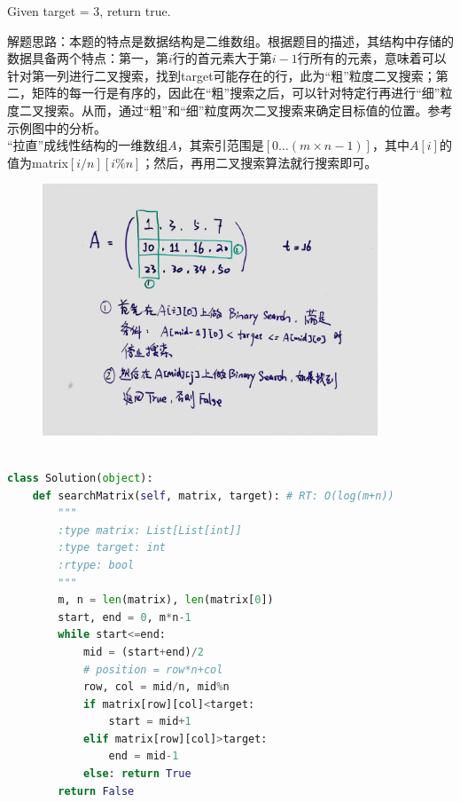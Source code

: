 \documentclass[a4paper,10pt]{article}
\begin{document}
\noindent Given target = 3, return true. \\

\begin{CJK*}{UTF8}{gbsn}
\noindent 解题思路：本题的特点是数据结构是二维数组。根据题目的描述，其结构中存储的数据具备两个特点：第一，第$i$行的首元素大于第$i-1$行所有的元素，意味着可以针对第一列进行二叉搜索，找到target可能存在的行，此为“粗”粒度二叉搜索；第二，矩阵的每一行是有序的，因此在“粗”搜索之后，可以针对特定行再进行“细”粒度二叉搜索。从而，通过“粗”和“细”粒度两次二叉搜索来确定目标值的位置。参考示例图中的分析。\\
“拉直”成线性结构的一维数组$A$，其索引范围是$[0 \dots (m\times n-1)]$，其中$A[i]$的值为matrix$[i/n][i\%n]$；然后，再用二叉搜索算法就行搜索即可。
\end{CJK*}

\begin{figure}[h]
    \includegraphics[width=10cm]{leetcode74.jpg}
    \centering\\
\end{figure}

\begin{lstlisting}[language=Python, caption=Problem74. Search a 2D Matrix]

class Solution(object):
    def searchMatrix(self, matrix, target): # RT: O(log(m+n))
        """
        :type matrix: List[List[int]]
        :type target: int
        :rtype: bool
        """
        m, n = len(matrix), len(matrix[0])
        start, end = 0, m*n-1
        while start<=end:
            mid = (start+end)/2
            # position = row*n+col
            row, col = mid/n, mid%n
            if matrix[row][col]<target:
                start = mid+1
            elif matrix[row][col]>target:
                end = mid-1
            else: return True
        return False
\end{lstlisting}
\end{document}
